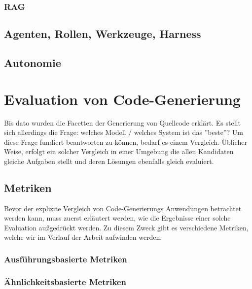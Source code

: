 
\subsubsection{RAG}


\subsection{Agenten, Rollen, Werkzeuge, Harness}



\subsection{Autonomie}

\section{Evaluation von Code-Generierung}\label{ch:Evaluation von Code-Generierung}

Bis dato wurden die Facetten der Generierung von Quellcode erklärt. Es stellt sich allerdings die Frage: welches Modell / welches System ist das ''beste''? Um diese Frage fundiert beantworten zu können, bedarf es einem Vergleich. Üblicher Weise, erfolgt ein solcher Vergleich in einer Umgebung die allen Kandidaten gleiche Aufgaben stellt und deren Lösungen ebenfalls gleich evaluiert.

\subsection{Metriken}\label{ch:Metriken}

Bevor der explizite Vergleich von Code-Generierungs Anwendungen betrachtet werden kann, muss zuerst erläutert werden, wie die Ergebnisse einer solche Evaluation außgedrückt werden. Zu diesem Zweck gibt es verschiedene Metriken, welche wir im Verlauf der Arbeit aufwinden werden.

\subsubsection{Ausführungsbasierte Metriken}


\subsubsection{Ähnlichkeitsbasierte Metriken}

